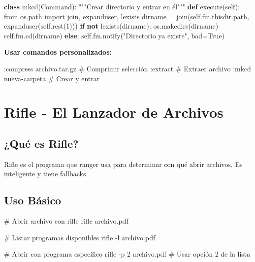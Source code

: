 \documentclass[
  doc,
  floatsintext,
  longtable,
  a4paper,
  nolmodern,
  notxfonts,
  notimes,
  12pt,
  colorlinks=true,linkcolor=blue,citecolor=blue,urlcolor=blue]{apa7}
\newenvironment{Shaded}{\begin{snugshade}}{\end{snugshade}}
\newcommand{\AttributeTok}[1]{\textcolor[rgb]{0.40,0.45,0.13}{#1}}
\newcommand{\CommentTok}[1]{\textcolor[rgb]{0.37,0.37,0.37}{#1}}
\newcommand{\ControlFlowTok}[1]{\textcolor[rgb]{0.00,0.23,0.31}{\textbf{#1}}}
\newcommand{\DecValTok}[1]{\textcolor[rgb]{0.68,0.00,0.00}{#1}}
\newcommand{\ExtensionTok}[1]{\textcolor[rgb]{0.00,0.23,0.31}{#1}}
\newcommand{\ImportTok}[1]{\textcolor[rgb]{0.00,0.46,0.62}{#1}}
\newcommand{\KeywordTok}[1]{\textcolor[rgb]{0.00,0.23,0.31}{\textbf{#1}}}
\newcommand{\NormalTok}[1]{\textcolor[rgb]{0.00,0.23,0.31}{#1}}
\newcommand{\OperatorTok}[1]{\textcolor[rgb]{0.37,0.37,0.37}{#1}}
\newcommand{\StringTok}[1]{\textcolor[rgb]{0.13,0.47,0.30}{#1}}
\newcommand{\VariableTok}[1]{\textcolor[rgb]{0.07,0.07,0.07}{#1}}
\begin{document}
\begin{Shaded}
\begin{Highlighting}[]
\KeywordTok{class}\NormalTok{ mkcd(Command):}
    \CommentTok{"""Crear directorio y entrar en él"""}
    \KeywordTok{def}\NormalTok{ execute(}\VariableTok{self}\NormalTok{):}
        \ImportTok{from}\NormalTok{ os.path }\ImportTok{import}\NormalTok{ join, expanduser, lexists}
\NormalTok{        dirname }\OperatorTok{=}\NormalTok{ join(}\VariableTok{self}\NormalTok{.fm.thisdir.path, expanduser(}\VariableTok{self}\NormalTok{.rest(}\DecValTok{1}\NormalTok{)))}
        \ControlFlowTok{if} \KeywordTok{not}\NormalTok{ lexists(dirname):}
\NormalTok{            os.makedirs(dirname)}
            \VariableTok{self}\NormalTok{.fm.cd(dirname)}
        \ControlFlowTok{else}\NormalTok{:}
            \VariableTok{self}\NormalTok{.fm.notify(}\StringTok{"Directorio ya existe"}\NormalTok{, bad}\OperatorTok{=}\VariableTok{True}\NormalTok{)}
\end{Highlighting}
\end{Shaded}

\textbf{Usar comandos personalizados:}

\begin{Shaded}
\begin{Highlighting}[]
\ExtensionTok{:compress}\NormalTok{ archivo.tar.gz    }\CommentTok{\# Comprimir selección}
\ExtensionTok{:extract}                    \CommentTok{\# Extraer archivo}
\ExtensionTok{:mkcd}\NormalTok{ nueva{-}carpeta         }\CommentTok{\# Crear y entrar}
\end{Highlighting}
\end{Shaded}

\section{Rifle - El Lanzador de
Archivos}\label{rifle---el-lanzador-de-archivos}

\subsection{¿Qué es Rifle?}\label{quuxe9-es-rifle}

Rifle es el programa que ranger usa para determinar con qué abrir
archivos. Es inteligente y tiene fallbacks.

\subsection{Uso Básico}\label{uso-buxe1sico}

\begin{Shaded}
\begin{Highlighting}[]
\CommentTok{\# Abrir archivo con rifle}
\ExtensionTok{rifle}\NormalTok{ archivo.pdf}

\CommentTok{\# Listar programas disponibles}
\ExtensionTok{rifle} \AttributeTok{{-}l}\NormalTok{ archivo.pdf}

\CommentTok{\# Abrir con programa específico}
\ExtensionTok{rifle} \AttributeTok{{-}p}\NormalTok{ 2 archivo.pdf  }\CommentTok{\# Usar opción 2 de la lista}
\end{Highlighting}
\end{Shaded}
\end{document}
